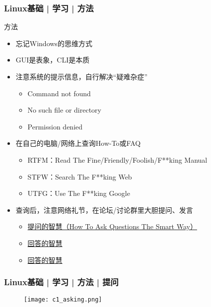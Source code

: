 \begin{frame}
  \frametitle{Linux基础 | 学习 | 方法}
  \begin{block}{方法}
    \begin{itemize}[<+->]
      \item 忘记Windows的思维方式
      \item GUI是表象，CLI是本质
      \item 注意系统的提示信息，自行解决“疑难杂症”
      \begin{itemize}
        \item Command not found
        \item No such file or directory
        \item Permission denied
      \end{itemize}
      \item 在自己的电脑/网络上查询How-To或FAQ
      \begin{itemize}
        \item RTFM：Read The Fine/Friendly/Foolish/F**king Manual
        \item STFW：Search The F**king Web
        \item UTFG：Use The F**king Google
      \end{itemize}
      \item 查询后，注意网络礼节，在论坛/讨论群里大胆提问、发言
      \begin{itemize}
        \item \href{https://github.com/ryanhanwu/How-To-Ask-Questions-The-Smart-Way/blob/master/README-zh_CN.md}{提问的智慧（How To Ask Questions The Smart Way）}
        \item \href{http://dbanotes.net/tech-memo/how_to_answer_questions_the_smart_way.html}{回答的智慧}
        \item \href{https://blog.m157q.tw/posts/2017/12/21/how-to-answer-questions-in-a-helpful-way-zh-tw/}{回答的智慧}
      \end{itemize}
    \end{itemize}
  \end{block}
\end{frame}

\begin{frame}
  \frametitle{Linux基础 | 学习 | 方法 | \alert{提问}}
  \begin{figure}
    \centering
    \texttt{[image: c1\_asking.png]}
  \end{figure}
\end{frame}

